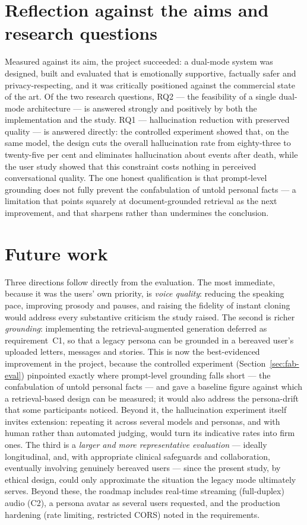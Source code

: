 \documentclass[11pt,a4paper]{report}
\begin{document}
\section{Reflection against the aims and research questions}
Measured against its aim, the project succeeded: a dual-mode system was designed, built and evaluated that is emotionally supportive, factually safer and privacy-respecting, and it was critically positioned against the commercial state of the art. Of the two research questions, RQ2 --- the feasibility of a single dual-mode architecture --- is answered strongly and positively by both the implementation and the study. RQ1 --- hallucination reduction with preserved quality --- is answered directly: the controlled experiment showed that, on the same model, the design cuts the overall hallucination rate from eighty-three to twenty-five per cent and eliminates hallucination about events after death, while the user study showed that this constraint costs nothing in perceived conversational quality. The one honest qualification is that prompt-level grounding does not fully prevent the confabulation of untold personal facts --- a limitation that points squarely at document-grounded retrieval as the next improvement, and that sharpens rather than undermines the conclusion.

\section{Future work}
\label{sec:future}
Three directions follow directly from the evaluation. The most immediate, because it was the users' own priority, is \emph{voice quality}: reducing the speaking pace, improving prosody and pauses, and raising the fidelity of instant cloning would address every substantive criticism the study raised. The second is richer \emph{grounding}: implementing the retrieval-augmented generation deferred as requirement~C1, so that a legacy persona can be grounded in a bereaved user's uploaded letters, messages and stories. This is now the best-evidenced improvement in the project, because the controlled experiment (Section~\ref{sec:fab-eval}) pinpointed exactly where prompt-level grounding falls short --- the confabulation of untold personal facts --- and gave a baseline figure against which a retrieval-based design can be measured; it would also address the persona-drift that some participants noticed. Beyond it, the hallucination experiment itself invites extension: repeating it across several models and personas, and with human rather than automated judging, would turn its indicative rates into firm ones. The third is a \emph{larger and more representative evaluation} --- ideally longitudinal, and, with appropriate clinical safeguards and collaboration, eventually involving genuinely bereaved users --- since the present study, by ethical design, could only approximate the situation the legacy mode ultimately serves. Beyond these, the roadmap includes real-time streaming (full-duplex) audio (C2), a persona avatar as several users requested, and the production hardening (rate limiting, restricted CORS) noted in the requirements.
\end{document}
